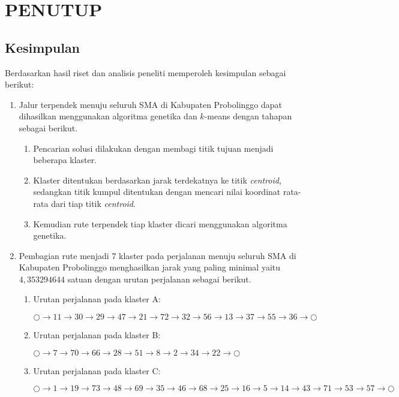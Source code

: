\chapter{PENUTUP}

\section{Kesimpulan}

Berdasarkan hasil riset dan analisis peneliti memperoleh kesimpulan sebagai berikut:

\begin{enumerate}
\item Jalur terpendek menuju seluruh SMA di Kabupaten Probolinggo dapat dihasilkan menggunakan algoritma genetika dan $k$-means dengan tahapan sebagai berikut.
\begin{enumerate}
\item Pencarian solusi dilakukan dengan membagi titik tujuan menjadi beberapa klaster.
\item Klaster ditentukan berdasarkan jarak terdekatnya ke titik \textit{centroid}, sedangkan titik kumpul ditentukan dengan mencari nilai koordinat rata-rata dari tiap titik \textit{centroid}.
\item Kemudian rute terpendek tiap klaster dicari menggunakan algoritma genetika.
\end{enumerate}

\item Pembagian rute menjadi 7 klaster pada perjalanan menuju seluruh SMA di Kabupaten Probolinggo menghasilkan jarak yang paling minimal yaitu $4,353294644$ satuan dengan urutan perjalanan sebagai berikut.

\begin{enumerate}

\item Urutan perjalanan pada klaster A:

$\bigcirc \to 11 \to 30 \to 29 \to 47 \to 21 \to 72 \to 32 \to 56 \to 13 \to 37 \to 55 \to 36 \to \bigcirc$

\item Urutan perjalanan pada klaster B:

$\bigcirc \to 7 \to 70 \to 66 \to 28 \to 51 \to 8 \to 2 \to 34 \to 22 \to \bigcirc$

\item Urutan perjalanan pada klaster C:

$\bigcirc \to 1 \to 19 \to 73 \to 48 \to 69 \to 35 \to 46 \to 68 \to 25 \to 16 \to 5 \to 14 \to 43 \to 71 \to 53 \to 57 \to \bigcirc$


\end{enumerate}
\end{enumerate}
